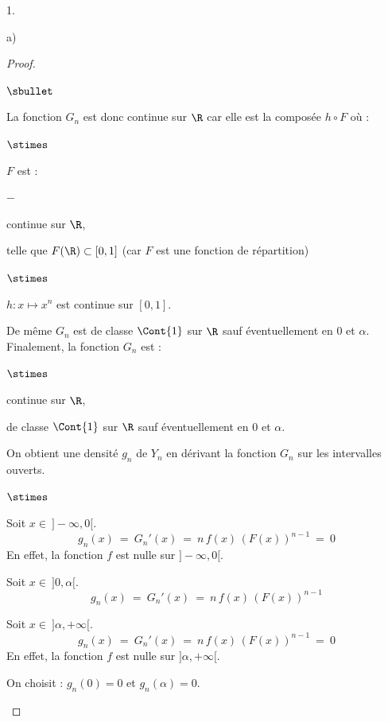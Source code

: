 \documentclass[11pt]{article}%
\begin{document}
\begin{noliste}{1.}
\begin{noliste}{a)}
\begin{proof}
\begin{noliste}{$\sbullet$}
	\item La fonction $G_n$ est donc continue sur $\R$ car elle est 
	la composée $h \circ F$ où :
	\begin{noliste}{$\stimes$}
	  \item $F$ est : 
	\end{noliste}
	  \begin{liste}{$-$}
	    \item continue sur $\R$,
	    \item telle que $F(\R) \subset [0,1]$ (car $F$ est une 
	    fonction de répartition)
	  \end{liste}
	\begin{noliste}{$\stimes$}
	  \item $h:x \mapsto x^n$ est continue sur $[0,1]$.
	\end{noliste}
	
	\item De même $G_n$ est de classe $\Cont{1}$ sur $\R$ 
	sauf éventuellement en $0$ et $\alpha$.\\
	Finalement, la fonction $G_n$ est :
	\begin{noliste}{$\stimes$}
	  \item continue sur $\R$,
	  \item de classe $\Cont{1}$ sur $\R$ sauf éventuellement en 
	  $0$ et $\alpha$.
	\end{noliste}
	
	\item On obtient une densité $g_n$ de $Y_n$ en dérivant la 
	fonction $G_n$ sur les intervalles ouverts.
	\begin{noliste}{$\stimes$}
	  \item Soit $x \in \ ]-\infty, 0[$.
	  \[
	    g_n(x) \ = \ G_n'(x) \ = \ n \, f(x) \, (F(x))^{n-1}
	    \ = \ 0
	  \]
	  En effet, la fonction $f$ est nulle sur $]-\infty, 0[$.
	  
	  \item Soit $x \in \ ]0, \alpha[$.
	  \[
	    g_n(x) \ = \ G_n'(x) \ = \ n \, f(x) \, (F(x))^{n-1}
	  \]
	  
	  \item Soit $x \in \ ] \alpha, + \infty[$.
	  \[
	    g_n(x) \ = \ G_n'(x) \ = \ n \, f(x) \, (F(x))^{n-1}
	    \ = \ 0
	  \]
	  En effet, la fonction $f$ est nulle sur $]\alpha, +\infty[$.
	  
	  \item On choisit : $g_n(0)=0$ et $g_n(\alpha)=0$.
	\end{noliste}
	

\end{noliste}
\end{proof}
\end{noliste}
\end{noliste}
\end{document}
